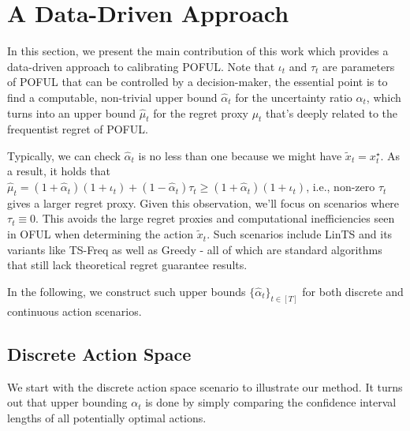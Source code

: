 \section{A Data-Driven Approach}\label{sec:data-driven}






In this section, we present the main contribution of this work which provides a data-driven approach to calibrating POFUL. Note that $\iota_t$ and $\tau_t$ are parameters of POFUL that can be controlled by a decision-maker, the essential point is to find a computable, non-trivial upper bound $\hat{\alpha}_t$ for the uncertainty ratio $\alpha_t$, which turns into an upper bound $\hat{\mu}_t$ for the regret proxy $\mu_t$ that's deeply related to the frequentist regret of POFUL. 




Typically, we can check $\hat{\alpha}_t$ is no less than one because we might have $ \tilde{x}_t = x_t^\star$. As a result, it holds that $\hat{\mu}_t  = (1+\hat{\alpha}_t)(1+\iota_t) +  (1-\hat{\alpha}_t) \tau_t \geq  (1+\hat{\alpha}_t)(1+\iota_t) $, i.e., non-zero $\tau_t$ gives a larger regret proxy. Given this observation, we'll focus on scenarios where $\tau_t \equiv 0$.  This avoids the large regret proxies and computational inefficiencies seen in OFUL when determining the action $\tilde{x}_t$. Such scenarios include LinTS and its variants like TS-Freq as well as Greedy - all of which are standard algorithms that still lack theoretical regret guarantee results.



In the following, we construct such upper bounds $\{\hat{\alpha}_t\}_{t\in[T]}$ for both discrete and continuous action scenarios. 
 
 
 
 











\subsection{Discrete Action Space}
\label{sec:discrete_actions}




We start with the discrete action space scenario to illustrate our method. It turns out that upper bounding $\alpha_t$ is done by simply comparing the confidence interval lengths of all potentially optimal actions. 





